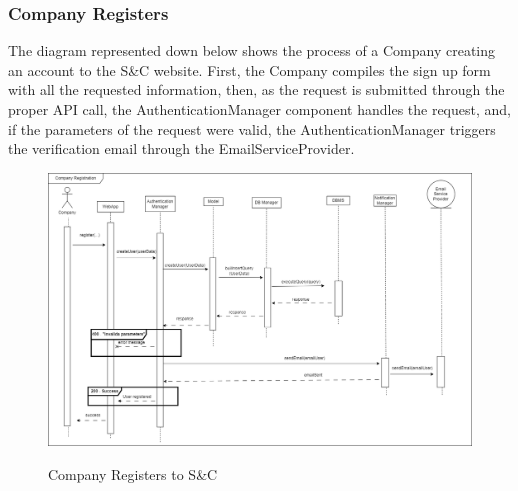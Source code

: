 \documentclass[a4paper,12pt]{article}
\begin{document}
\newpage
\subsubsection*{Company Registers}
The diagram represented down below shows the process of a Company creating an account to the S\&C website. First, the Company compiles the sign up form with all the requested information, then, as the request is submitted through the proper API call, the AuthenticationManager component handles the request, and, if the parameters of the request were valid, the AuthenticationManager
triggers the verification email through the EmailServiceProvider.
\begin{figure}[H]
\centering
\includegraphics[scale = 0.35]{DD_figures/RuntimeView/CompanyRegistersRV.drawio.png}\\
\caption{Company Registers to S\&C}
\end{figure}

\newpage
\end{document}
